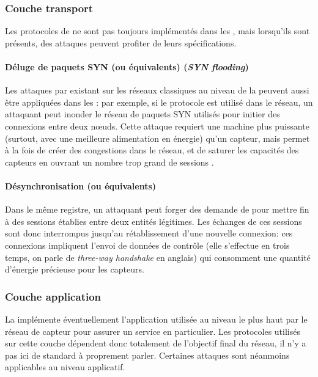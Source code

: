     \subsubsection{Couche transport}
Les protocoles de  ne sont pas toujours implémentés dans les \rcsfs, mais lorsqu'ils sont présents, des attaques peuvent profiter de leurs spécifications.

        \paragraph{Déluge de paquets SYN (ou équivalents) (\textit{SYN flooding})}
Les attaques par \dds existant sur les réseaux classiques au niveau de la  peuvent aussi être appliquées dans les \rcs: par exemple, si le protocole \tcp est utilisé dans le réseau, un attaquant peut inonder le réseau de paquets SYN utilisés pour initier des connexions entre deux nœuds.
Cette attaque requiert une machine plus puissante (surtout, avec une meilleure alimentation en énergie) qu'un capteur, mais permet à la fois de créer des congestions dans le réseau, et de saturer les capacités des capteurs en ouvrant un nombre trop grand de sessions \tcp.

        \paragraph{Désynchronisation \tcp (ou équivalents)}
Dans le même registre, un attaquant peut forger des demande de \desync pour mettre fin à des sessions \tcp établies entre deux entités légitimes.
Les échanges de ces sessions sont donc interrompus jusqu'au rétablissement d'une nouvelle connexion: ces connexions impliquent l'envoi de données de contrôle (elle s'effectue en trois temps, on parle de \textit{three-way handshake} en anglais) qui consomment une quantité d'énergie précieuse pour les capteurs.

    \subsubsection{Couche application}
La  implémente éventuellement l'application utilisée au niveau le plus haut par le réseau de capteur pour assurer un service en particulier.
Les protocoles utilisés sur cette couche dépendent donc totalement de l'objectif final du réseau, il n'y a pas ici de standard à proprement parler.
Certaines attaques sont néanmoins applicables au niveau applicatif.

